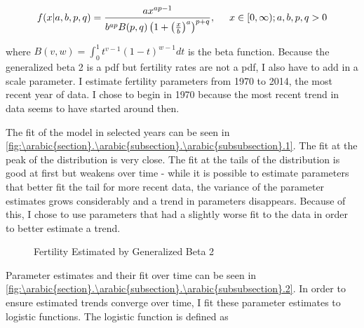 \documentclass[10pt]{article}
\renewcommand{\thesection}{\arabic{section}}
\renewcommand{\thesubsection}{\thesection.\arabic{subsection}}
\renewcommand{\thesubsubsection}{\thesubsection.\arabic{subsubsection}}
\numberwithin{equation}{subsection}
\newcommand*{\FigureDir}{../../graphs}
\begin{document}
\begin{equation}\label{eq:gb2_pdf}
   f(x|a, b, p, q) = \frac{ax^{ap-1}}{b^{ap}B(p,q)\left(1 + \left(\frac{x}{b}\right)^a\right)^{p+q}}, \hspace{5mm} x \in [0,\infty); a, b, p, q > 0   
\end{equation}

\par where \(B(v,w) = \int_0^1 t^{v-1}(1-t)^{w-1}dt\) is the beta function. Because the generalized beta 2 is a pdf but fertility rates are not a pdf, I also have to add in a scale parameter. I estimate fertility parameters from 1970 to 2014, the most recent year of data. I chose to begin in 1970 because the most recent trend in data seems to have started around then.

\par The fit of the model in selected years can be seen in \autoref{fig:\thesubsubsection.1}. The fit at the peak of the distribution is very close. The fit at the tails of the distribution is good at first but weakens over time - while it is possible to estimate parameters that better fit the tail for more recent data, the variance of the parameter estimates grows considerably and a trend in parameters disappears. Because of this, I chose to use parameters that had a slightly worse fit to the data in order to better estimate a trend.

\begin{figure}[!ht]
   \centering
   \caption{\label{fig:\thesubsubsection.1}Fertility Estimated by Generalized Beta 2}
\end{figure}

\par Parameter estimates and their fit over time can be seen in \autoref{fig:\thesubsubsection.2}. In order to ensure estimated trends converge over time, I fit these parameter estimates to logistic functions. The logistic function is defined as
\end{document}
